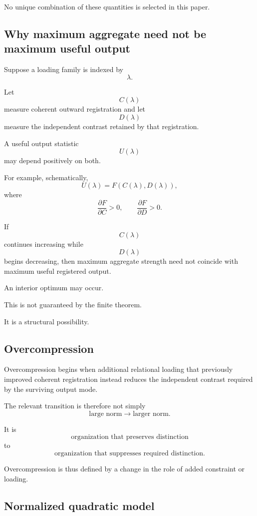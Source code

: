 No unique combination of these quantities is selected in this paper.

\subsection{Why maximum aggregate need not be maximum useful output}

Suppose a loading family is indexed by
\[
\lambda.
\]

Let
\[
C(\lambda)
\]
measure coherent outward registration and let
\[
D(\lambda)
\]
measure the independent contrast retained by that registration.

A useful output statistic
\[
U(\lambda)
\]
may depend positively on both.

For example, schematically,
\[
U(\lambda)
=
F(C(\lambda),D(\lambda)),
\]
where
\[
\frac{\partial F}{\partial C}>0,
\qquad
\frac{\partial F}{\partial D}>0.
\]

If
\[
C(\lambda)
\]
continues increasing while
\[
D(\lambda)
\]
begins decreasing, then maximum aggregate strength need not coincide
with maximum useful registered output.

An interior optimum may occur.

This is not guaranteed by the finite theorem.

It is a structural possibility.

\subsection{Overcompression}

\begin{definition}[Overcompression]
Overcompression begins when additional relational loading that
previously improved coherent registration instead reduces the
independent contrast required by the surviving output mode.
\end{definition}

The relevant transition is therefore not simply
\[
\text{large norm}
\longrightarrow
\text{larger norm}.
\]

It is
\[
\text{organization that preserves distinction}
\]
to
\[
\text{organization that suppresses required distinction}.
\]

Overcompression is thus defined by a change in the role of added
constraint or loading.

\subsection{Normalized quadratic model}

